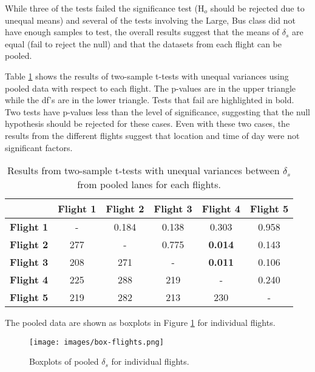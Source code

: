 \documentclass[preprint,12pt,a4paper]{elsarticle}
\begin{document}
\begin{linenumbers}
While three of the tests failed the significance test (H$_{o}$ should be rejected due to unequal means) and several of the tests involving the Large, Bus class did not have enough samples to test, the overall results suggest that the means of $\delta_{s}$ are equal (fail to reject the null) and that the datasets from each flight can be pooled.

Table \ref{tab:lanepooled} shows the results of two-sample t-tests with unequal variances using pooled data with respect to each flight. The p-values are in the upper triangle while the df's are in the lower triangle. Tests that fail are highlighted in bold. Two tests have p-values less than the level of significance, suggesting that the null hypothesis should be rejected for these cases. Even with these two cases, the results from the different flights suggest that location and time of day were not significant factors.

\begin{table}[H]
\centering
\caption{Results from two-sample t-tests with unequal variances between $\delta_{s}$ from pooled lanes for each flights.}
\label{tab:lanepooled}
\begin{tabular}{@{}lccccc@{}}
\toprule
 & \textbf{Flight 1} & \textbf{Flight 2} & \textbf{Flight 3} & \textbf{Flight 4} & \textbf{Flight 5} \\ \midrule
\textbf{Flight 1} & - & 0.184 & 0.138 & 0.303 & 0.958 \\
\textbf{Flight 2} & 277 & - & 0.775 & \textbf{0.014} & 0.143 \\
\textbf{Flight 3} & 208 & 271 & - & \textbf{0.011} & 0.106 \\
\textbf{Flight 4} & 225 & 288 & 219 & - & 0.240 \\
\textbf{Flight 5} & 219 & 282 & 213 & 230 & - \\ \bottomrule
\end{tabular}
\end{table}

The pooled data are shown as boxplots in Figure \ref{fig:box-flights} for individual flights.

\begin{figure}[H]
\centering
\texttt{[image: images/box-flights.png]} 
\caption{Boxplots of pooled $\delta_{s}$ for individual flights.}
\label{fig:box-flights}
\end{figure}


\end{linenumbers}
\end{document}
